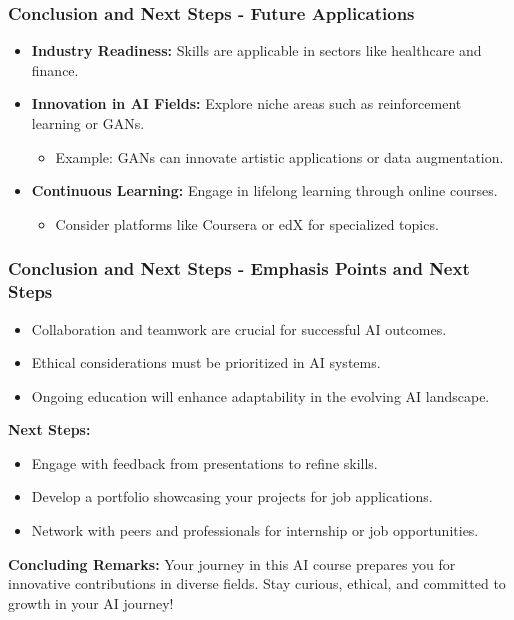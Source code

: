 \documentclass[aspectratio=169]{beamer}
\begin{document}
\begin{frame}[fragile]
    \frametitle{Conclusion and Next Steps - Future Applications}
    
    \begin{itemize}
        \item \textbf{Industry Readiness:} Skills are applicable in sectors like healthcare and finance.
        \item \textbf{Innovation in AI Fields:} Explore niche areas such as reinforcement learning or GANs.
        \begin{itemize}
            \item Example: GANs can innovate artistic applications or data augmentation.
        \end{itemize}
        \item \textbf{Continuous Learning:} Engage in lifelong learning through online courses.
        \begin{itemize}
            \item Consider platforms like Coursera or edX for specialized topics.
        \end{itemize}
    \end{itemize}
\end{frame}

\begin{frame}[fragile]
    \frametitle{Conclusion and Next Steps - Emphasis Points and Next Steps}
    
    \begin{itemize}
        \item Collaboration and teamwork are crucial for successful AI outcomes.
        \item Ethical considerations must be prioritized in AI systems.
        \item Ongoing education will enhance adaptability in the evolving AI landscape.
    \end{itemize}
    
    \textbf{Next Steps:}
    \begin{itemize}
        \item Engage with feedback from presentations to refine skills.
        \item Develop a portfolio showcasing your projects for job applications.
        \item Network with peers and professionals for internship or job opportunities.
    \end{itemize}
    
    \textbf{Concluding Remarks:} Your journey in this AI course prepares you for innovative contributions in diverse fields. Stay curious, ethical, and committed to growth in your AI journey!
\end{frame}
\end{document}
